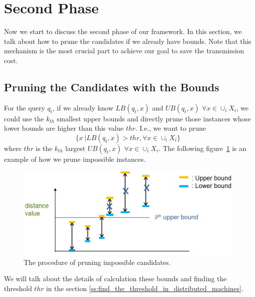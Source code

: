 \section{Second Phase}
\label{s:prune}
Now we start to discuss the second phase of our framework.  In this section, we talk about how to prune the candidates if we already have bounds.  Note that this mechanism is the most crucial part to achieve our goal to save the transmission cost.


\subsection{Pruning the Candidates with the Bounds} %
\label{ss:prune_the_candidates_with_the_bounds}

For the query $q_t$, if we already know $LB(q_t,x)$ and $UB(q_t,x)$ $\forall x\in \cup_i X_i$, we could use the $k_{th}$ smallest upper bounds and directly prune those instances whose lower bounds are higher than this value $thr$. I.e., we want to prune
\[
\{x~|LB(q_t,x)>thr, \forall x \in \cup_i X_i\}
\]
where $thr$ is the $k_{th}$ largest $UB(q_t,x)$ $\forall x\in \cup_i X_i$.  The following figure~\ref{fig:prune} is an example of how we prune impossible instances.

\begin{figure}[htpb!]
  \centering
    \includegraphics[width=1.0\textwidth]{fig/prune.png}
    \caption{\label{fig:prune}The procedure of pruning impossible candidates.}
\end{figure}

We will talk about the details of calculation these bounds and finding the threshold $thr$ in the section \ref{ss:find_the_threshold_in_distributed_machines}.


